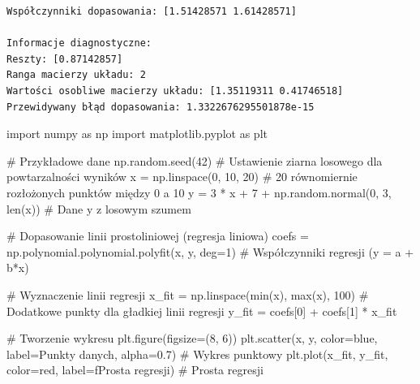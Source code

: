 \documentclass[
  polish,
  letterpaper,
  DIV=11,
  numbers=noendperiod]{scrreprt}
\newenvironment{Shaded}{\begin{snugshade}}{\end{snugshade}}
\newcommand{\BuiltInTok}[1]{\textcolor[rgb]{0.00,0.23,0.31}{#1}}
\newcommand{\CommentTok}[1]{\textcolor[rgb]{0.37,0.37,0.37}{#1}}
\newcommand{\DecValTok}[1]{\textcolor[rgb]{0.68,0.00,0.00}{#1}}
\newcommand{\FloatTok}[1]{\textcolor[rgb]{0.68,0.00,0.00}{#1}}
\newcommand{\ImportTok}[1]{\textcolor[rgb]{0.00,0.46,0.62}{#1}}
\newcommand{\NormalTok}[1]{\textcolor[rgb]{0.00,0.23,0.31}{#1}}
\newcommand{\OperatorTok}[1]{\textcolor[rgb]{0.37,0.37,0.37}{#1}}
\newcommand{\SpecialStringTok}[1]{\textcolor[rgb]{0.13,0.47,0.30}{#1}}
\newcommand{\StringTok}[1]{\textcolor[rgb]{0.13,0.47,0.30}{#1}}
\begin{document}
\begin{verbatim}
Współczynniki dopasowania: [1.51428571 1.61428571]

Informacje diagnostyczne:
Reszty: [0.87142857]
Ranga macierzy układu: 2
Wartości osobliwe macierzy układu: [1.35119311 0.41746518]
Przewidywany błąd dopasowania: 1.3322676295501878e-15
\end{verbatim}

\begin{Shaded}
\begin{Highlighting}[]
\ImportTok{import}\NormalTok{ numpy }\ImportTok{as}\NormalTok{ np}
\ImportTok{import}\NormalTok{ matplotlib.pyplot }\ImportTok{as}\NormalTok{ plt}

\CommentTok{\# Przykładowe dane}
\NormalTok{np.random.seed(}\DecValTok{42}\NormalTok{)  }\CommentTok{\# Ustawienie ziarna losowego dla powtarzalności wyników}
\NormalTok{x }\OperatorTok{=}\NormalTok{ np.linspace(}\DecValTok{0}\NormalTok{, }\DecValTok{10}\NormalTok{, }\DecValTok{20}\NormalTok{)  }\CommentTok{\# 20 równomiernie rozłożonych punktów między 0 a 10}
\NormalTok{y }\OperatorTok{=} \DecValTok{3} \OperatorTok{*}\NormalTok{ x }\OperatorTok{+} \DecValTok{7} \OperatorTok{+}\NormalTok{ np.random.normal(}\DecValTok{0}\NormalTok{, }\DecValTok{3}\NormalTok{, }\BuiltInTok{len}\NormalTok{(x))  }\CommentTok{\# Dane y z losowym szumem}

\CommentTok{\# Dopasowanie linii prostoliniowej (regresja liniowa)}
\NormalTok{coefs }\OperatorTok{=}\NormalTok{ np.polynomial.polynomial.polyfit(x, y, deg}\OperatorTok{=}\DecValTok{1}\NormalTok{)  }\CommentTok{\# Współczynniki regresji (y = a + b*x)}

\CommentTok{\# Wyznaczenie linii regresji}
\NormalTok{x\_fit }\OperatorTok{=}\NormalTok{ np.linspace(}\BuiltInTok{min}\NormalTok{(x), }\BuiltInTok{max}\NormalTok{(x), }\DecValTok{100}\NormalTok{)  }\CommentTok{\# Dodatkowe punkty dla gładkiej linii regresji}
\NormalTok{y\_fit }\OperatorTok{=}\NormalTok{ coefs[}\DecValTok{0}\NormalTok{] }\OperatorTok{+}\NormalTok{ coefs[}\DecValTok{1}\NormalTok{] }\OperatorTok{*}\NormalTok{ x\_fit}

\CommentTok{\# Tworzenie wykresu}
\NormalTok{plt.figure(figsize}\OperatorTok{=}\NormalTok{(}\DecValTok{8}\NormalTok{, }\DecValTok{6}\NormalTok{))}
\NormalTok{plt.scatter(x, y, color}\OperatorTok{=}\StringTok{\textquotesingle{}blue\textquotesingle{}}\NormalTok{, label}\OperatorTok{=}\StringTok{\textquotesingle{}Punkty danych\textquotesingle{}}\NormalTok{, alpha}\OperatorTok{=}\FloatTok{0.7}\NormalTok{)  }\CommentTok{\# Wykres punktowy}
\NormalTok{plt.plot(x\_fit, y\_fit, color}\OperatorTok{=}\StringTok{\textquotesingle{}red\textquotesingle{}}\NormalTok{, label}\OperatorTok{=}\SpecialStringTok{f\textquotesingle{}Prosta regresji\textquotesingle{}}\NormalTok{)  }\CommentTok{\# Prosta regresji}


\end{Highlighting}
\end{Shaded}
\end{document}
